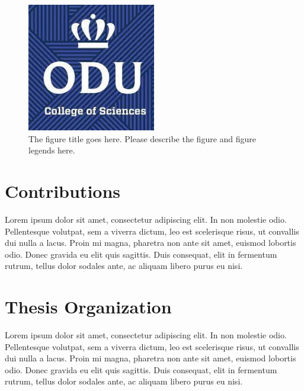 \begin{figure}[tbh]
  \centering
  \includegraphics[width=0.5\textwidth]{Figures/cos1.jpeg}
  \caption[The figure title goes here.]{The figure title goes here. Please describe the figure and figure legends here.}
  \label{fig:cos1}
\end{figure}

\section{Contributions}
Lorem ipsum dolor sit amet, consectetur adipiscing elit. In non molestie odio. Pellentesque volutpat, sem a viverra dictum, leo est scelerisque risus, ut convallis dui nulla a lacus. Proin mi magna, pharetra non ante sit amet, euismod lobortis odio. Donec gravida eu elit quis sagittis. Duis consequat, elit in fermentum rutrum, tellus dolor sodales ante, ac aliquam libero purus eu nisi. 

\section{Thesis Organization}
Lorem ipsum dolor sit amet, consectetur adipiscing elit. In non molestie odio. Pellentesque volutpat, sem a viverra dictum, leo est scelerisque risus, ut convallis dui nulla a lacus. Proin mi magna, pharetra non ante sit amet, euismod lobortis odio. Donec gravida eu elit quis sagittis. Duis consequat, elit in fermentum rutrum, tellus dolor sodales ante, ac aliquam libero purus eu nisi. 
